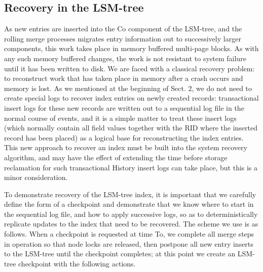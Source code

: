 \documentclass[a4paper,11pt,notitlepage,twoside,openright]{article}
\begin{document}
\hypertarget{recovery-in-the-lsm-tree}{%
\subsection{Recovery in the LSM-tree}\label{recovery-in-the-lsm-tree}}


As new entries are inserted into the Co component of the LSM-tree, and
the rolling merge processes migrates entry information out to
successively larger components, this work takes place in memory buffered
multi-page blocks. As with any such memory buffered changes, the work is
not resistant to system failure until it has been written to disk. We
are faced with a classical recovery problem: to reconstruct work that
has taken place in memory after a crash occurs and memory is lost. As we
mentioned at the beginning of Sect. 2, we do not need to create special
logs to recover index entries on newly created records: transactional
insert logs for these new records are written out to a sequential log
file in the normal course of events, and it is a simple matter to treat
these insert logs (which normally contain all field values together with
the RID where the inserted record has been placed) as a logical base for
reconstructing the index entries. This new approach to recover an index
must be built into the system recovery algorithm, and may have the
effect of extending the time before storage reclamation for such
transactional History insert logs can take place, but this is a minor
consideration.

To demonstrate recovery of the LSM-tree index, it is important that we
carefully define the form of a checkpoint and demonstrate that we know
where to start in the sequential log file, and how to apply successive
logs, so as to deterministically replicate updates to the index that
need to be recovered. The scheme we use is as follows. When a checkpoint
is requested at time To, we complete all merge steps in operation so
that node locks are released, then postpone all new entry inserts to the
LSM-tree until the checkpoint completes; at this point we create an
LSM-tree checkpoint with the following actions.
\end{document}
